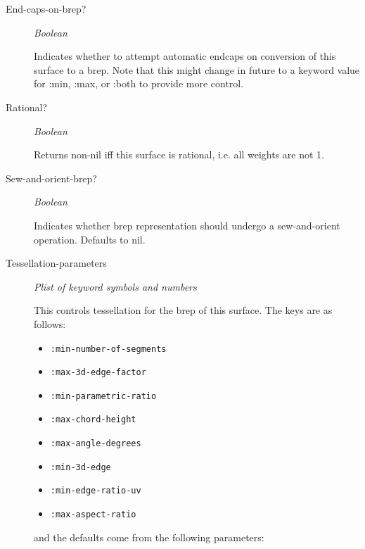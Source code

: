 \documentclass [11pt]{book}
\begin{document}
\begin{itemize}
\begin{description}
\item [End-caps-on-brep?]
\emph{Boolean}

 Indicates whether to attempt automatic endcaps on conversion
of this surface to a brep.
Note that this might change in future to a keyword value
for :min, :max, or :both to provide more control.




\item [Rational?]
\emph{Boolean}

 Returns non-nil iff this surface is rational, i.e. all weights are not 1.




\item [Sew-and-orient-brep?]
\emph{Boolean}

 Indicates whether brep representation should undergo a
sew-and-orient operation. Defaults to nil.




\item [Tessellation-parameters]
\emph{Plist of keyword symbols and numbers}

 This controls tessellation for the brep of this surface.
The keys are as follows:


\begin{itemize}

\item \texttt{:min-number-of-segments}


\item \texttt{:max-3d-edge-factor}


\item \texttt{:min-parametric-ratio}


\item \texttt{:max-chord-height}


\item \texttt{:max-angle-degrees}


\item \texttt{:min-3d-edge}


\item \texttt{:min-edge-ratio-uv}


\item \texttt{:max-aspect-ratio}


\end{itemize}


and the defaults come from the following parameters:



\end{description}
\end{itemize}
\end{document}
